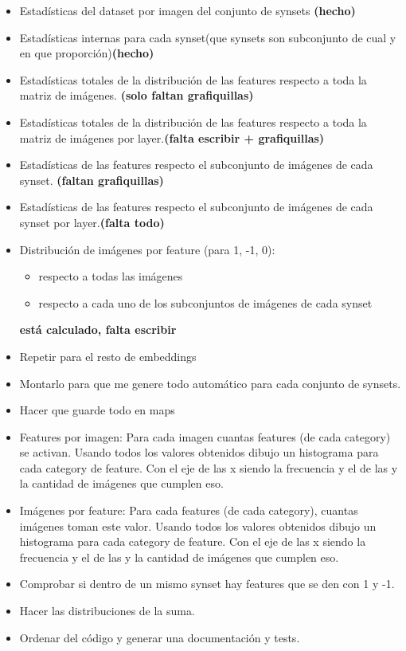 \documentclass{article}
\begin{document}
\begin{itemize}
\item Estadísticas del dataset por imagen del conjunto de synsets \textbf{(hecho)}
\item Estadísticas internas para cada synset(que synsets son subconjunto de cual y en que proporción)\textbf{(hecho)}
\item Estadísticas totales de la distribución de las features respecto a toda la matriz de imágenes. \textbf{(solo faltan grafiquillas)}
\item  Estadísticas totales de la distribución de las features respecto a toda la matriz de imágenes por layer.\textbf{(falta escribir + grafiquillas)}
\item Estadísticas de las features respecto el subconjunto de imágenes de cada synset. \textbf{(faltan grafiquillas)}
\item Estadísticas de las features respecto el subconjunto de imágenes de cada synset por layer.\textbf{(falta todo)}
\item Distribución de imágenes por feature (para 1, -1, 0):
\begin{itemize}
\item respecto a todas las imágenes
\item respecto a cada uno de los subconjuntos de imágenes de cada synset 
\end{itemize}
\textbf{está calculado, falta escribir}
\item Repetir para el resto de embeddings
\item Montarlo para que me genere todo automático para cada conjunto de synsets.
\item Hacer que guarde todo en maps  
\item Features por imagen: Para cada imagen cuantas features (de cada category) se activan. Usando todos los valores obtenidos dibujo un histograma
para cada category de feature. Con el eje de las x siendo la frecuencia y el de las y la cantidad de imágenes que cumplen eso.
\item Imágenes por feature: Para cada features (de cada category), cuantas imágenes toman este valor. Usando todos los valores obtenidos dibujo un histograma
para cada category de feature. Con el eje de las x siendo la frecuencia y el de las y la cantidad de imágenes que cumplen eso.  
\item Comprobar si dentro de un mismo synset hay features que se den con 1 y -1.
\item Hacer las distribuciones de la suma.
\item Ordenar del código y generar una documentación y tests.

\end{itemize}
\end{document}

